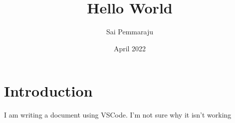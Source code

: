 \documentclass{article}
\title{Hello World}
\author{Sai Pemmaraju}
\date{April 2022}
\begin{document}
\maketitle

\section{Introduction}
I am writing a document using VSCode. I'm not sure why it isn't working 
\end{document}
